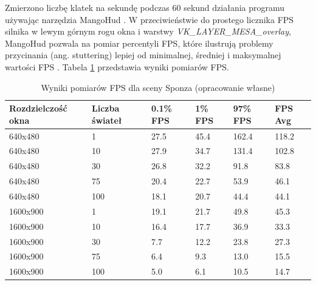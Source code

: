 Zmierzono liczbę klatek na sekundę podczas $60$ sekund działania programu używając narzędzia MangoHud \cite{MANGOHUD}.
W przeciwieństwie do prostego licznika FPS silnika w lewym górnym rogu okna i warstwy \textit{VK\_LAYER\_MESA\_overlay}, MangoHud pozwala na pomiar percentyli FPS, które ilustrują problemy przycinania (ang. stuttering) lepiej od minimalnej, średniej i maksymalnej wartości FPS \cite{NVSTUTTER}.
Tabela \ref{results_fps} przedstawia wyniki pomiarów FPS.
\begin{table}[!ht]
	\centering
	\begin{tabular}{ |p{2cm}|p{1.1cm}||p{0.7cm}|p{0.7cm}|p{0.7cm}|p{0.7cm}|}
		\hline
		Rozdzielczość okna & Liczba świateł & 0.1\% FPS & 1\% FPS & 97\% FPS  & FPS Avg \\
		\hline \hline
		640x480 & 1 & 27.5  & 45.4 & 162.4 & 118.2 \\
		\hline 
		640x480 & 10 & 27.9 & 34.7 & 131.4 & 102.8 \\
		\hline 
		640x480 & 30 & 26.8 & 32.2 & 91.8 & 83.8 \\
		\hline 
		640x480 & 75 & 20.4 & 22.7 & 53.9 & 46.1 \\
		\hline 
		640x480 & 100 & 18.1 & 20.7 & 44.4 & 44.1 \\
		\hline 	\hline 
		1600x900 & 1 & 19.1 & 21.7 & 49.8 & 45.3 \\
		\hline 
		1600x900 & 10 & 16.4 & 17.7 & 36.9 & 33.3 \\
		\hline 
		1600x900 & 30 & 7.7 & 12.2 & 23.8 & 27.3 \\
		\hline 
		1600x900 & 75 & 6.4 & 9.3 & 13.0 & 15.5 \\
		\hline 
		1600x900 & 100 & 5.0 & 6.1 & 10.5 & 14.7 \\
		\hline
	\end{tabular}
	\caption{Wyniki pomiarów FPS dla sceny Sponza (opracowanie własne)} 
	\label{results_fps}
\end{table}


